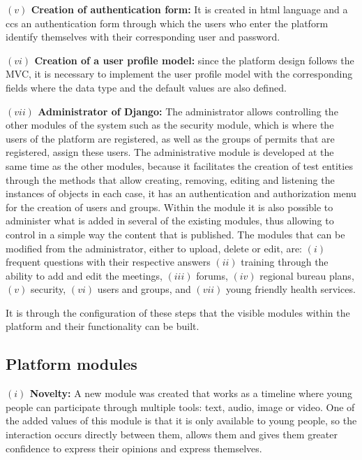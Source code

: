 \documentclass[journal,transmag]{IEEEtran}
\begin{document}
\textbf{$(v)$ Creation of authentication form:} It is created in html language and a ccs an authentication form through which the users who enter the platform identify themselves with their corresponding user and password.

\textbf{$(vi)$ Creation of a user profile model:} since the platform design follows the MVC, it is necessary to implement the user profile model with the corresponding fields where the data type and the default values are also defined.

\textbf{$(vii)$ Administrator of Django:} The administrator allows controlling the other modules of the system such as the security module, which is where the users of the platform are registered, as well as the groups of permits that are registered, assign these users. The administrative module is developed at the same time as the other modules, because it facilitates the creation of test entities through the methods that allow creating, removing, editing and listening the instances of objects in each case, it has an authentication and authorization menu for the creation of users and groups. Within the module it is also possible to administer what is added in several of the existing modules, thus allowing to control in a simple way the content that is published. The modules that can be modified from the administrator, either to upload, delete or edit, are: $(i)$ frequent questions with their respective answers $(ii)$ training through the ability to add and edit the meetings, $(iii)$ forums, $(iv)$ regional bureau plans, $(v)$ security, $(vi)$ users and groups, and $(vii)$ young friendly health services. 

It is through the configuration of these steps that the visible modules within the platform and their functionality can be built.

\subsection{Platform modules}

\textbf{$(i)$ Novelty:} A new module was created that works as a timeline where young people can participate through multiple tools: text, audio, image or video. One of the added values of this module is that it is only available to young people, so the interaction occurs directly between them, allows them and gives them greater confidence to express their opinions and express themselves. 
\end{document}
